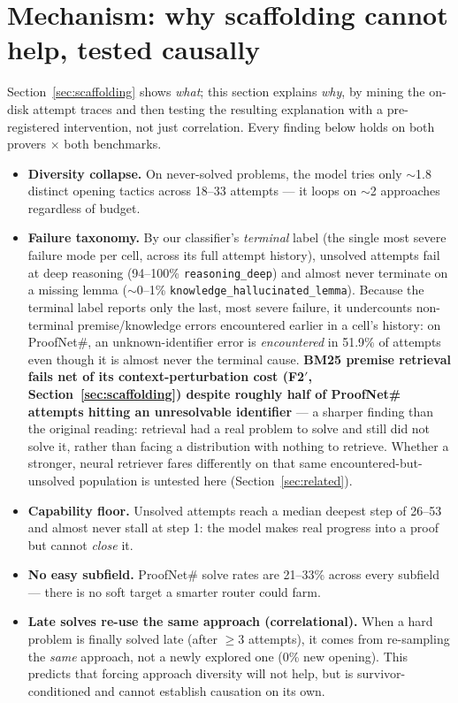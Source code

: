 \documentclass{article}
\begin{document}
\section{Mechanism: why scaffolding cannot help, tested causally}
\label{sec:mechanism}

Section~\ref{sec:scaffolding} shows \emph{what}; this section explains \emph{why}, by mining the
on-disk attempt traces and then testing the resulting explanation with a pre-registered intervention,
not just correlation. Every finding below holds on both provers $\times$ both benchmarks.

\begin{itemize}
  \item[\textbf{F1}] \textbf{Diversity collapse.} On never-solved problems, the model tries only
    $\sim$1.8 distinct opening tactics across 18--33 attempts --- it loops on $\sim$2 approaches
    regardless of budget.
  \item[\textbf{F2}] \textbf{Failure taxonomy.} By our classifier's \emph{terminal} label (the single
    most severe failure mode per cell, across its full attempt history), unsolved attempts fail at deep
    reasoning (94--100\% \texttt{reasoning\_deep}) and almost never terminate on a missing lemma
    ($\sim$0--1\% \texttt{knowledge\_hallucinated\_lemma}). Because the terminal label reports only the
    last, most severe failure, it undercounts non-terminal premise/knowledge errors encountered earlier
    in a cell's history: on ProofNet\#, an unknown-identifier error is \emph{encountered} in 51.9\% of
    attempts even though it is almost never the terminal cause. \textbf{BM25 premise retrieval fails
    net of its context-perturbation cost (F2$'$, Section~\ref{sec:scaffolding}) despite roughly half
    of ProofNet\# attempts hitting an unresolvable identifier} --- a sharper finding than the original
    reading: retrieval had a real problem to solve and still did not solve it, rather than facing a
    distribution with nothing to retrieve. Whether a stronger, neural retriever fares differently on
    that same encountered-but-unsolved population is untested here (Section~\ref{sec:related}).
  \item[\textbf{F3}] \textbf{Capability floor.} Unsolved attempts reach a median deepest step of
    26--53 and almost never stall at step 1: the model makes real progress into a proof but cannot
    \emph{close} it.
  \item[\textbf{F4}] \textbf{No easy subfield.} ProofNet\# solve rates are 21--33\% across every
    subfield --- there is no soft target a smarter router could farm.
  \item[\textbf{F5}] \textbf{Late solves re-use the same approach (correlational).} When a hard problem
    is finally solved late (after $\geq$3 attempts), it comes from re-sampling the \emph{same} approach,
    not a newly explored one (0\% new opening). This predicts that forcing approach diversity will not
    help, but is survivor-conditioned and cannot establish causation on its own.
\end{itemize}
\end{document}
